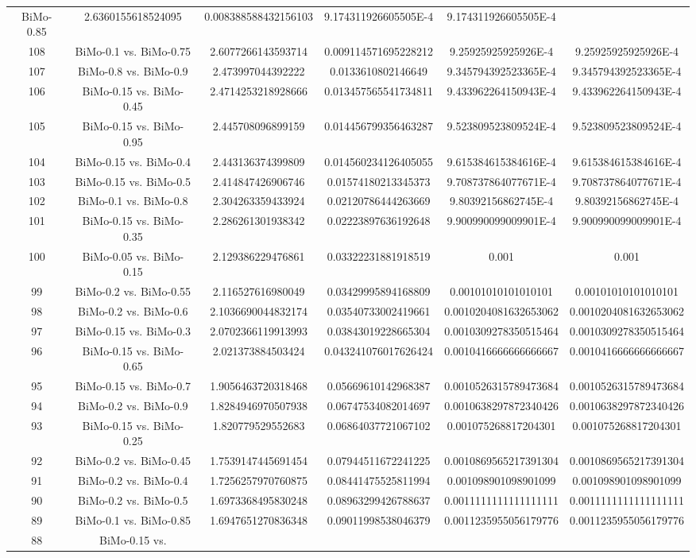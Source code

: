 \documentclass[a4paper,10pt]{article}
\begin{document}
\begin{landscape}
\begin{table}[!htp]
\begin{tabular}{cccccc}
BiMo-0.85&2.6360155618524095&0.008388588432156103&9.174311926605505E-4&9.174311926605505E-4\\108&BiMo-0.1 vs. BiMo-0.75&2.6077266143593714&0.009114571695228212&9.25925925925926E-4&9.25925925925926E-4\\107&BiMo-0.8 vs. BiMo-0.9&2.473997044392222&0.0133610802146649&9.345794392523365E-4&9.345794392523365E-4\\106&BiMo-0.15 vs. BiMo-0.45&2.4714253218928666&0.013457565541734811&9.433962264150943E-4&9.433962264150943E-4\\105&BiMo-0.15 vs. BiMo-0.95&2.445708096899159&0.014456799356463287&9.523809523809524E-4&9.523809523809524E-4\\104&BiMo-0.15 vs. BiMo-0.4&2.443136374399809&0.014560234126405055&9.615384615384616E-4&9.615384615384616E-4\\103&BiMo-0.15 vs. BiMo-0.5&2.414847426906746&0.01574180213345373&9.708737864077671E-4&9.708737864077671E-4\\102&BiMo-0.1 vs. BiMo-0.8&2.304263359433924&0.02120786444263669&9.80392156862745E-4&9.80392156862745E-4\\101&BiMo-0.15 vs. BiMo-0.35&2.286261301938342&0.02223897636192648&9.900990099009901E-4&9.900990099009901E-4\\100&BiMo-0.05 vs. BiMo-0.15&2.129386229476861&0.03322231881918519&0.001&0.001\\99&BiMo-0.2 vs. BiMo-0.55&2.116527616980049&0.03429995894168809&0.00101010101010101&0.00101010101010101\\98&BiMo-0.2 vs. BiMo-0.6&2.1036690044832174&0.03540733002419661&0.0010204081632653062&0.0010204081632653062\\97&BiMo-0.15 vs. BiMo-0.3&2.0702366119913993&0.03843019228665304&0.0010309278350515464&0.0010309278350515464\\96&BiMo-0.15 vs. BiMo-0.65&2.021373884503424&0.043241076017626424&0.0010416666666666667&0.0010416666666666667\\95&BiMo-0.15 vs. BiMo-0.7&1.9056463720318468&0.05669610142968387&0.0010526315789473684&0.0010526315789473684\\94&BiMo-0.2 vs. BiMo-0.9&1.8284946970507938&0.06747534082014697&0.0010638297872340426&0.0010638297872340426\\93&BiMo-0.15 vs. BiMo-0.25&1.820779529552683&0.06864037721067102&0.001075268817204301&0.001075268817204301\\92&BiMo-0.2 vs. BiMo-0.45&1.7539147445691454&0.07944511672241225&0.0010869565217391304&0.0010869565217391304\\91&BiMo-0.2 vs. BiMo-0.4&1.7256257970760875&0.08441475525811994&0.001098901098901099&0.001098901098901099\\90&BiMo-0.2 vs. BiMo-0.5&1.6973368495830248&0.08963299426788637&0.0011111111111111111&0.0011111111111111111\\89&BiMo-0.1 vs. BiMo-0.85&1.6947651270836348&0.09011998538046379&0.0011235955056179776&0.0011235955056179776\\88&BiMo-0.15 vs. 
\end{tabular}
\end{table}
\end{landscape}
\end{document}
